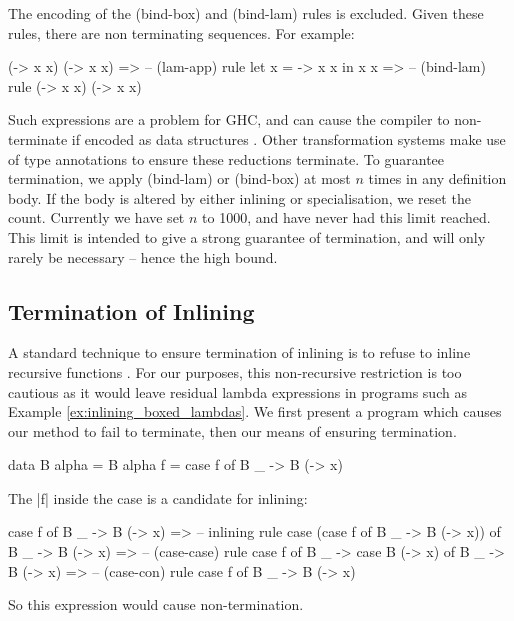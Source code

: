 \documentclass[preprint]{sigplanconf}
\begin{document}
The encoding of the (bind-box) and (bind-lam) rules is excluded. Given these rules, there are non terminating sequences. For example:

\begin{onepage}
\ignore\begin{code}
(\x -> x x) (\x -> x x)
   => -- (lam-app) rule
let x = \x -> x x in x x
   => -- (bind-lam) rule
(\x -> x x) (\x -> x x)
\end{code}
\end{onepage}

Such expressions are a problem for GHC, and can cause the compiler to non-terminate if encoded as data structures \cite{spj:inlining}. Other transformation systems \cite{chin:higher_order_removal} make use of type annotations to ensure these reductions terminate. To guarantee termination, we apply (bind-lam) or (bind-box) at most $n$ times in any definition body. If the body is altered by either inlining or specialisation, we reset the count. Currently we have set $n$ to 1000, and have never had this limit reached. This limit is intended to give a strong guarantee of termination, and will only rarely be necessary -- hence the high bound.

\subsection{Termination of Inlining}

A standard technique to ensure termination of inlining is to refuse to inline recursive functions \cite{spj:inlining}. For our purposes, this non-recursive restriction is too cautious as it would leave residual lambda expressions in programs such as Example \ref{ex:inlining_boxed_lambdas}. We first present a program which causes our method to fail to terminate, then our means of ensuring termination.

\begin{example}
\begin{code}
data B alpha = B alpha
f = case  f of
          B _ -> B (\x -> x)
\end{code}

\noindent The |f| inside the case is a candidate for inlining:

\ignore\begin{code}
case f of B _ -> B (\x -> x)
    => -- inlining rule
case (case f of B _ -> B (\x -> x)) of B _ -> B (\x -> x)
    => -- (case-case) rule
case f of B _ -> case B (\x -> x) of B _ -> B (\x -> x)
    => -- (case-con) rule
case f of B _ -> B (\x -> x)
\end{code}

\noindent So this expression would cause non-termination.
\end{example}
\end{document}
